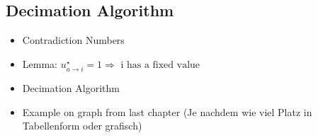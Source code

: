\subsection{Decimation Algorithm}

\begin{itemize}
\item Contradiction Numbers
\item Lemma: $u^{\star}_{a \rightarrow i} = 1 \Rightarrow \text{ i has a fixed value}$
\item Decimation Algorithm
\item Example on graph from last chapter
	  (Je nachdem wie viel Platz in Tabellenform oder grafisch)

\end{itemize} 
\newtheorem*{lemma}{Lemma}


\newpage